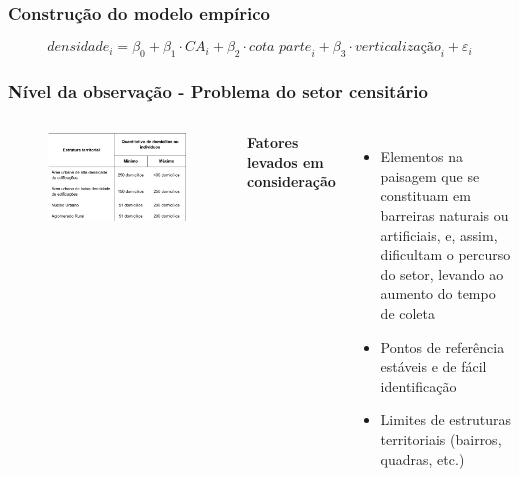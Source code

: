 \documentclass[%
    9pt, 
    aspectratio=169,
]{beamer}
\begin{document}
\begin{frame}
    \frametitle{Construção do modelo empírico}
    \fontsize{12pt}{7}
    \begin{equation*}
        \textit{densidade}_i = \beta_0 + \beta_1 \cdot \textit{CA}_i + \beta_2 \cdot\textit{cota parte}_i + \beta_3\cdot\textit{verticalização}_i + \varepsilon_i
        \label{eq:reg}
    \end{equation*}
\end{frame}

\begin{frame}
    \frametitle{Nível da observação - Problema do setor censitário}
    \begin{columns}
        \begin{figure}
            \includegraphics[width = \textwidth]{imagens/tabela_ibge.png}
        \end{figure}


        \textbf{Fatores levados em consideração}
        \begin{itemize}
            \item Elementos na paisagem que se constituam em barreiras naturais ou artificiais, e, assim, dificultam o percurso do setor, levando ao aumento do tempo de coleta
            \item Pontos de referência estáveis e de fácil identificação
            \item Limites de estruturas territoriais (bairros, quadras, etc.)
        \end{itemize}

    \end{columns}
\end{frame}
\end{document}
